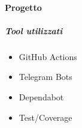     \paragraph{Progetto}
        
        \subparagraph{Tool utilizzati}
        \begin{itemize}
            \item GitHub Actions
            \item Telegram Bots
            \item Dependabot
            \item Test/Coverage
        \end{itemize}








